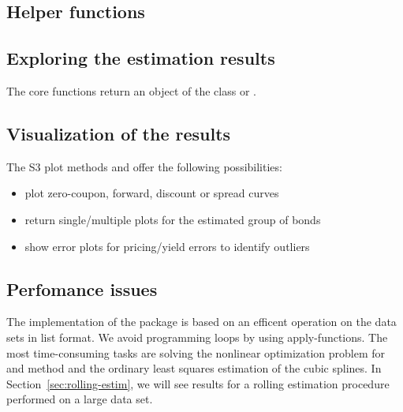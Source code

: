\subsection{Helper functions}
\label{sec:helper-functions}


\subsection{Exploring the estimation results}
\label{sec:expl-estim-results}


The core functions return an object of the class  or .


\subsection{Visualization of the results}
\label{sec:visu-results}

The S3 plot methods  and  offer the following possibilities:

\begin{itemize}
\item plot zero-coupon, forward, discount or spread curves
\item return single/multiple plots for the estimated group of bonds
\item show error plots for pricing/yield errors to identify outliers
\end{itemize}

\subsection{Perfomance issues}
\label{sec:perfomance-issues}

The implementation of the  package is based on an efficent operation on the data sets in list format. We avoid programming loops by using apply-functions. The most time-consuming tasks are solving the nonlinear optimization problem for \cite{Nelson1987} and \cite{Svensson1994} method and the ordinary least squares estimation of the \cite{McCulloch1975} cubic splines. In Section~\ref{sec:rolling-estim}, we will see results for a rolling estimation procedure performed on a large data set.


